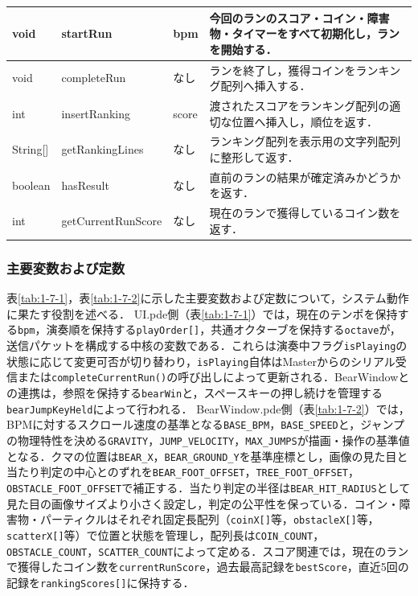\documentclass[uplatex,dvipdfmx]{jlreq}
\begin{document}
{\begin{tabularx}{\textwidth}{|M{1.6cm}|M{2.8cm}|M{2.3cm}|Y|}
    void & startRun & bpm & 今回のランのスコア・コイン・障害物・タイマーをすべて初期化し，ランを開始する． \\ \hline
    void & completeRun & なし & ランを終了し，獲得コインをランキング配列へ挿入する． \\ \hline
    int & insertRanking & score & 渡されたスコアをランキング配列の適切な位置へ挿入し，順位を返す． \\ \hline
    String[] & getRankingLines & なし & ランキング配列を表示用の文字列配列に整形して返す． \\ \hline
    boolean & hasResult & なし & 直前のランの結果が確定済みかどうかを返す． \\ \hline
    int & getCurrentRunScore & なし & 現在のランで獲得しているコイン数を返す． \\ \hline
\end{tabularx}
}

\subsubsection{主要変数および定数}

表\ref{tab:1-7-1}，表\ref{tab:1-7-2}に示した主要変数および定数について，システム動作に果たす役割を述べる．
UI.pde側（表\ref{tab:1-7-1}）では，現在のテンポを保持する\texttt{bpm}，演奏順を保持する\texttt{playOrder[]}，共通オクターブを保持する\texttt{octave}が，送信パケットを構成する中核の変数である．これらは演奏中フラグ\texttt{isPlaying}の状態に応じて変更可否が切り替わり，\texttt{isPlaying}自体はMasterからのシリアル受信または\texttt{completeCurrentRun()}の呼び出しによって更新される．BearWindowとの連携は，参照を保持する\texttt{bearWin}と，スペースキーの押し続けを管理する\texttt{bearJumpKeyHeld}によって行われる．
BearWindow.pde側（表\ref{tab:1-7-2}）では，BPMに対するスクロール速度の基準となる\texttt{BASE\_BPM}，\texttt{BASE\_SPEED}と，ジャンプの物理特性を決める\texttt{GRAVITY}，\texttt{JUMP\_VELOCITY}，\texttt{MAX\_JUMPS}が描画・操作の基準値となる．クマの位置は\texttt{BEAR\_X}，\texttt{BEAR\_GROUND\_Y}を基準座標とし，画像の見た目と当たり判定の中心とのずれを\texttt{BEAR\_FOOT\_OFFSET}，\texttt{TREE\_FOOT\_OFFSET}，\texttt{OBSTACLE\_FOOT\_OFFSET}で補正する．当たり判定の半径は\texttt{BEAR\_HIT\_RADIUS}として見た目の画像サイズより小さく設定し，判定の公平性を保っている．コイン・障害物・パーティクルはそれぞれ固定長配列（\texttt{coinX[]}等，\texttt{obstacleX[]}等，\texttt{scatterX[]}等）で位置と状態を管理し，配列長は\texttt{COIN\_COUNT}，\texttt{OBSTACLE\_COUNT}，\texttt{SCATTER\_COUNT}によって定める．スコア関連では，現在のランで獲得したコイン数を\texttt{currentRunScore}，過去最高記録を\texttt{bestScore}，直近5回の記録を\texttt{rankingScores[]}に保持する．
\end{document}
